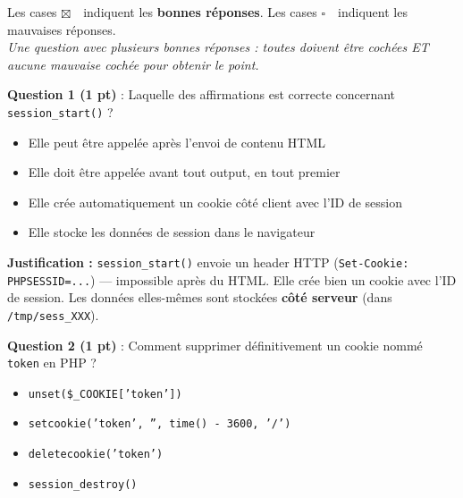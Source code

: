 \documentclass[11pt,a4paper]{article}
\newcommand{\cbv}{\textcolor{correctgreen}{$\boxtimes$}\ }  %
\newcommand{\cbx}{\textcolor{wrongred}{$\square$}\ }         %
\begin{document}
\newpage

\begin{tcolorbox}[exbox, title={QCM --- Corrigé \hfill /5 pts (1 pt par question, réponse complète uniquement)}]
Les cases \cbv\ indiquent les \textbf{bonnes réponses}. Les cases \cbx\ indiquent les mauvaises réponses.\\
\textit{Une question avec plusieurs bonnes réponses : toutes doivent être cochées ET aucune mauvaise cochée pour obtenir le point.}
\end{tcolorbox}

\vspace{6pt}

\noindent\textbf{Question 1 (1 pt)} : Laquelle des affirmations est correcte concernant \texttt{session\_start()} ?

\begin{itemize}[leftmargin=2em, itemsep=4pt, topsep=4pt]
  \item[\cbx] Elle peut être appelée après l'envoi de contenu HTML
  \item[\cbv] Elle doit être appelée avant tout output, en tout premier
  \item[\cbv] Elle crée automatiquement un cookie côté client avec l'ID de session
  \item[\cbx] Elle stocke les données de session dans le navigateur
\end{itemize}

\begin{tcolorbox}[notebox]
\textbf{Justification :} \texttt{session\_start()} envoie un header HTTP (\texttt{Set-Cookie: PHPSESSID=...}) --- impossible après du HTML. Elle crée bien un cookie avec l'ID de session. Les données elles-mêmes sont stockées \textbf{côté serveur} (dans \texttt{/tmp/sess\_XXX}).
\end{tcolorbox}

\vspace{8pt}

\noindent\textbf{Question 2 (1 pt)} : Comment supprimer définitivement un cookie nommé \texttt{token} en PHP ?

\begin{itemize}[leftmargin=2em, itemsep=4pt, topsep=4pt]
  \item[\cbx] \texttt{unset(\$\_COOKIE['token'])}
  \item[\cbv] \texttt{setcookie('token', '', time() - 3600, '/')}
  \item[\cbx] \texttt{deletecookie('token')}
  \item[\cbx] \texttt{session\_destroy()}
\end{itemize}
\end{document}
